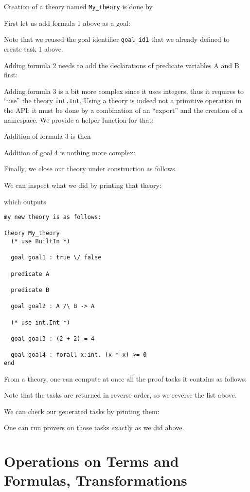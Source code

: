 Creation of a theory named \verb|My_theory| is done by

First let us add formula 1 above as a goal:

Note that we reused the goal identifier \verb|goal_id1| that we
already defined to create task 1 above.

Adding formula 2 needs to add the declarations of predicate variables A
and B first:


Adding formula 3 is a bit more complex since it uses integers, thus it
requires to ``use'' the theory \verb|int.Int|. Using a theory is
indeed not a primitive operation in the API: it must be done by a
combination of an ``export'' and the creation of a namespace. We
provide a helper function for that:

Addition of formula 3 is then


Addition of goal 4 is nothing more complex:


Finally, we close our theory under construction as follows.


We can inspect what we did by printing that theory:

which outputs
\begin{verbatim}
my new theory is as follows:

theory My_theory
  (* use BuiltIn *)

  goal goal1 : true \/ false

  predicate A

  predicate B

  goal goal2 : A /\ B -> A

  (* use int.Int *)

  goal goal3 : (2 + 2) = 4

  goal goal4 : forall x:int. (x * x) >= 0
end
\end{verbatim}

From a theory, one can compute at once all the proof tasks it contains
as follows:

Note that the tasks are returned in reverse order, so we reverse the
list above.

We can check our generated tasks by printing them:


One can run provers on those tasks exactly as we did above.

\section{Operations on Terms and Formulas, Transformations}

